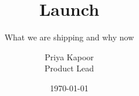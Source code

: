 \documentclass[aspectratio=169,11pt]{beamer}
\title{Launch}
\subtitle{What we are shipping and why now}
\author{Priya Kapoor \\ \small Product Lead}
\date{\today}
\begin{document}
\titleslide





\end{document}
